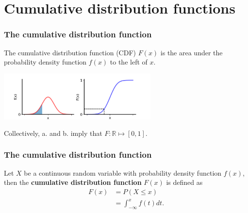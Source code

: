 \documentclass[9pt]{beamer}
\begin{document}
\section{Cumulative distribution functions}
\begin{frame}
\frametitle{The cumulative distribution function}

The cumulative distribution function (CDF) $F(x)$ is the area under the probability density function $f(x)$ to the left of $x$.

\begin{center}
\includegraphics[height=2.5cm]{images/pdf_cdf_1.png}
\end{center}

Collectively, a. and b. imply that $F: \mathbb{R} \mapsto [0, 1]$.

\end{frame}

\begin{frame}
\frametitle{The cumulative distribution function}


\vspace{.3cm}

\begin{definition} 
Let $X$ be a continuous random variable with probability density function $f(x)$, then the \textbf{cumulative distribution function} $F(x)$ is defined as
\begin{align*}
F(x) &= P(X \leq x)\\
&= \int_{-\infty}^x f(t) dt.
\end{align*} 
\end{definition}

\vspace{0.5cm}


\end{frame}
\end{document}
